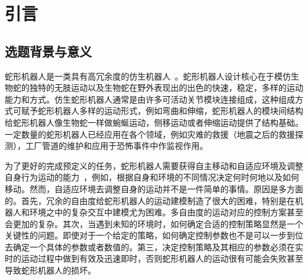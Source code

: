 
\chapter{引言}
\label{cha:introduction}
\section{选题背景与意义}
\label{sec:background}
蛇形机器人是一类具有高冗余度的仿生机器人~\cite{Chirikjian1995The}。蛇形机器人设计核心在于模仿生物蛇的独特的无肢运动以及生物蛇在野外表现出的出色的快速，稳定，多样的运动能力和方式。仿生蛇形机器人通常是由许多可活动关节模块连接组成，这种组成方式可赋予蛇形机器人多样的运动形式，例如弯曲和伸缩，蛇形机器人的模块间结构给蛇形机器人像生物蛇一样做蜿蜒运动，侧移运动或者伸缩运动提供了结构基础。一定数量的蛇形机器人已经应用在各个领域，例如灾难的救援（地震之后的救援探测），工厂管道的维护和应用于恐怖事件中作监视作用。

为了更好的完成预定义的任务，蛇形机器人需要获得自主移动和自适应环境及调整自身行为运动的能力~\cite{Liljeb2013Snake}，例如，根据自身和环境的不同情况决定何时何地以及如何移动。然而，自适应环境去调整自身的运动并不是一件简单的事情。原因是多方面的。首先，冗余的自由度给蛇形机器人的运动建模制造了很大的困难，特别是在机器人和环境之中的复杂交互中建模尤为困难。多自由度的运动对应的控制方案甚至会更加的复杂。其次，当遇到未知的环境时，如何确定合适的控制策略显然是一个关键性的问题。即使对于一个给定的策略，如何确定控制参数也不是可以一步到位去确定一个具体的参数或者数值的。第三，决定控制策略及其相应的参数必须在实时的运动过程中做到有效及迅速即时，否则蛇形机器人的运动很有可能会失败甚至导致蛇形机器人的损坏。

